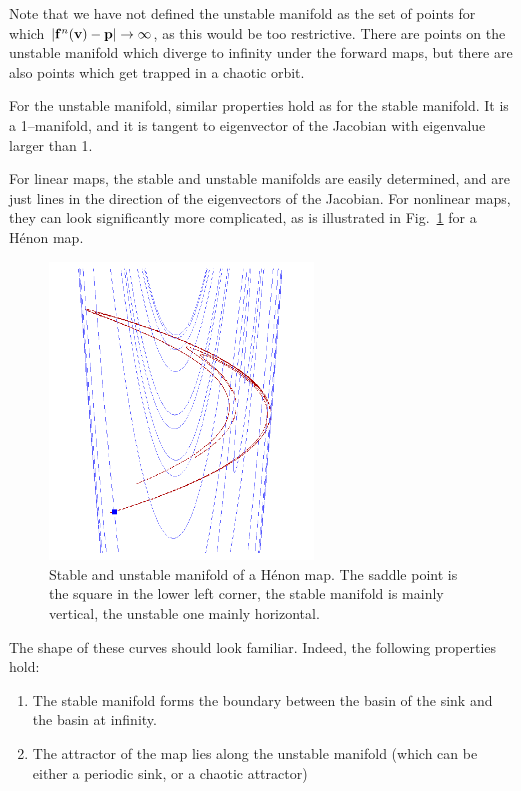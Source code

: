 Note that we have not defined the unstable manifold as the set of points for which $|{\bf f}^{n}({\bf v}) - {\bf p}| \to \infty$, as this would be too restrictive. There are points on the unstable manifold which diverge to infinity under the forward maps, but there are also points which get trapped in a chaotic orbit.

For the unstable manifold, similar properties hold as for the stable manifold. It is a 1--manifold, and it is tangent to eigenvector of the Jacobian with eigenvalue larger than 1.

For linear maps, the stable and unstable manifolds are easily determined, and are just lines in the direction of the eigenvectors of the Jacobian. For nonlinear maps, they can look significantly more complicated, as is illustrated in Fig.~\ref{fig-manifold} for a H\'{e}non map. 

\begin{figure}
\centering
\includegraphics[width=7cm]{dynamic/figures/manifold}
\caption{Stable and unstable manifold of a H\'{e}non map. The saddle point is the square in the lower left corner, the stable manifold is mainly vertical, the unstable one mainly horizontal.}
\label{fig-manifold}
\end{figure} 

The shape of these curves should look familiar. Indeed, the following properties hold:

\begin{enumerate}
\item
The stable manifold forms the boundary between the basin of the sink and the basin at infinity.
\item
The attractor of the map lies along the unstable manifold (which can be either a periodic sink, or a chaotic attractor)
\end{enumerate}


